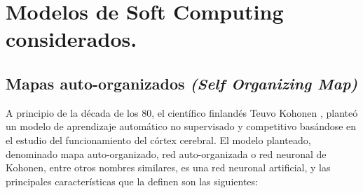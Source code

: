 ﻿%
\chapter{Modelos de Soft Computing considerados.}
\section{Mapas auto-organizados \textit{(Self Organizing Map)}}
A principio de la década de los 80, el científico finlandés Teuvo Kohonen \cite{kohonensom}, planteó un modelo de aprendizaje automático no supervisado y competitivo basándose en el estudio del funcionamiento del córtex cerebral. El modelo planteado, denominado mapa auto-organizado, red auto-organizada o red neuronal de Kohonen, entre otros nombres similares, es una red neuronal artificial, y las principales características que la definen son las siguientes:\\

